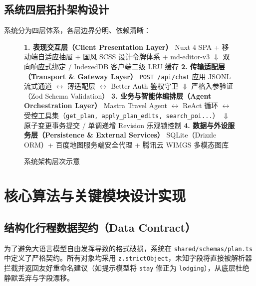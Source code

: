 \documentclass[11pt,a4paper,UTF8]{ctexart}
\begin{document}
\subsection{系统四层拓扑架构设计}
系统分为四层体系，各层边界分明、依赖清晰：

\begin{figure}[htbp]
\centering
\begin{tcolorbox}[colback=backcolour,colframe=black!30,title=\textbf{山海行笺 · 四层软件工程架构拓扑}]
\small
\textbf{1. 表现交互层（Client Presentation Layer）}\newline
Nuxt 4 SPA + 移动端自适应抽屉 + 国风 SCSS 设计令牌体系 + md-editor-v3\newline
\quad $\Downarrow$ 双向响应式绑定 / IndexedDB 客户端二级 LRU 缓存\newline
\textbf{2. 传输适配层（Transport \& Gateway Layer）}\newline
\texttt{POST /api/chat} 应用 JSONL 流式通道 $\leftrightarrow$ 薄适配层 $\leftrightarrow$ Better Auth 鉴权守卫\newline
\quad $\Downarrow$ 严格入参验证（Zod Schema Validation）\newline
\textbf{3. 业务与智能体编排层（Agent Orchestration Layer）}\newline
Mastra Travel Agent $\leftrightarrow$ ReAct 循环 $\leftrightarrow$ 受控工具集（\texttt{get\_plan, apply\_plan\_edits, search\_poi...}）\newline
\quad $\Downarrow$ 原子变更事务提交 / 单调递增 Revision 乐观锁控制\newline
\textbf{4. 数据与外设服务层（Persistence \& External Services）}\newline
SQLite（Drizzle ORM）+ 百度地图服务端安全代理 + 腾讯云 WIMGS 多模态图库
\end{tcolorbox}
\caption{系统架构层次示意}
\label{fig:arch}
\end{figure}

\section{核心算法与关键模块设计实现}

\subsection{结构化行程数据契约（Data Contract）}
为了避免大语言模型自由发挥导致的格式破损，系统在 \texttt{shared/schemas/plan.ts} 中定义了严格契约。所有对象均采用 \texttt{z.strictObject}，未知字段将直接被解析器拦截并返回友好重命名建议（如提示模型将 \texttt{stay} 修正为 \texttt{lodging}），从底层杜绝静默丢弃与字段漂移。
\end{document}
